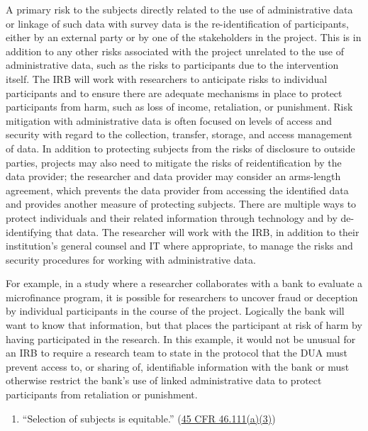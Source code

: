 \documentclass[
]{book}
\providecommand{\tightlist}{%
  \setlength{\itemsep}{0pt}\setlength{\parskip}{0pt}}
\begin{document}
A primary risk to the subjects directly related to the use of administrative data or linkage of such data with survey data is the re-identification of participants, either by an external party or by one of the stakeholders in the project. This is in addition to any other risks associated with the project unrelated to the use of administrative data, such as the risks to participants due to the intervention itself. The IRB will work with researchers to anticipate risks to individual participants and to ensure there are adequate mechanisms in place to protect participants from harm, such as loss of income, retaliation, or punishment. Risk mitigation with administrative data is often focused on levels of access and security with regard to the collection, transfer, storage, and access management of data. In addition to protecting subjects from the risks of disclosure to outside parties, projects may also need to mitigate the risks of reidentification by the data provider; the researcher and data provider may consider an arms-length agreement, which prevents the data provider from accessing the identified data and provides another measure of protecting subjects. There are multiple ways to protect individuals and their related information through technology and by de-identifying that data. The researcher will work with the IRB, in addition to their institution's general counsel and IT where appropriate, to manage the risks and security procedures for working with administrative data.

For example, in a study where a researcher collaborates with a bank to evaluate a microfinance program, it is possible for researchers to uncover fraud or deception by individual participants in the course of the project. Logically the bank will want to know that information, but that places the participant at risk of harm by having participated in the research. In this example, it would not be unusual for an IRB to require a research team to state in the protocol that the DUA must prevent access to, or sharing of, identifiable information with the bank or must otherwise restrict the bank's use of linked administrative data to protect participants from retaliation or punishment.

\begin{enumerate}
\def\labelenumi{(\arabic{enumi})}
\setcounter{enumi}{2}
\tightlist
\item
  ``Selection of subjects is equitable.'' (\href{https://www.law.cornell.edu/cfr/text/45/46.111}{45 CFR 46.111(a)(3)})
\end{enumerate}
\end{document}
